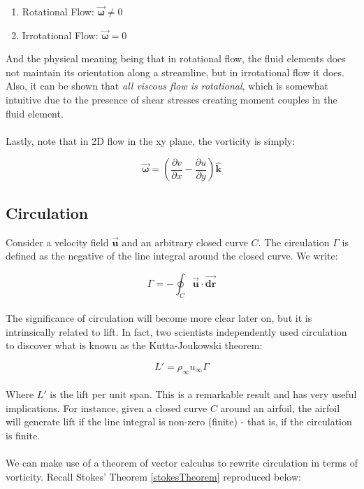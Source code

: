 \documentclass[11pt]{article}
\begin{document}
\begin{enumerate}
    \item Rotational Flow: $\vec{\bm{\omega}} \neq 0$
    \item Irrotational Flow: $\vec{\bm{\omega}} = 0$
\end{enumerate}
\noindent
And the physical meaning being that in rotational flow, the fluid elements does not maintain its orientation along a streamline, but in irrotational flow it does. Also, it can be shown that \emph{all viscous flow is rotational}, which is somewhat intuitive due to the presence of shear stresses creating moment couples in the fluid element. \\ \\
\noindent
Lastly, note that in 2D flow in the xy plane, the vorticity is simply:

\begin{equation*}
    \vec{\bm{\omega}} = \left( \frac{\partial v}{\partial x} - \frac{\partial u}{\partial y} \right) \hat{\bm{k}}
\end{equation*}

\subsection{Circulation}
Consider a velocity field $\vec{\bm{u}}$ and an arbitrary closed curve $C$. The circulation $\Gamma$ is defined as the negative of the line integral around the closed curve. We write:

\begin{equation*}
    \Gamma = - \oint_C\vec{\bm{u}}\cdot\vec{\bm{dr}}
\end{equation*} \\
\noindent
The significance of circulation will become more clear later on, but it is intrinsically related to lift. In fact, two scientists independently used circulation to discover what is known as the Kutta-Joukowski theorem:

\begin{equation*}
    L' = \rho_\infty u_\infty \Gamma
\end{equation*}\\
\noindent
Where $L'$ is the lift per unit span. This is a remarkable result and has very useful implications. For instance, given a closed curve $C$ around an airfoil, the airfoil will generate lift if the line integral is non-zero (finite) - that is, if the circulation is finite. \\ \\
\noindent
We can make use of a theorem of vector calculus to rewrite circulation in terms of vorticity. Recall Stokes' Theorem \eqref{stokesTheorem} reproduced below:
\end{document}
